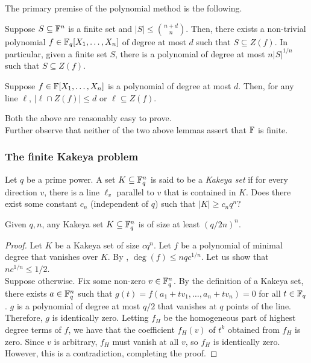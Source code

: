 	The primary premise of the polynomial method is the following.

	\begin{lemma}
		\label{poly method}
		Suppose $S \subseteq \mathbb{F}^n$ is a finite set and $|S| \le \binom{n+d}{n}$. Then, there exists a non-trivial polynomial $f \in \mathbb{F}_q[X_1,\ldots,X_n]$ of degree at most $d$ such that $S \subseteq Z(f)$. In particular, given a finite set $S$, there is a polynomial of degree at most $n|S|^{1/n}$ such that $S \subseteq Z(f)$.
	\end{lemma}

	\begin{lemma}
		\label{poly method: line containment}
		Suppose $f \in \mathbb{F}[X_1,\ldots,X_n]$ is a polynomial of degree at most $d$. Then, for any line $\ell$, $|\ell \cap Z(f)| \le d$ or $\ell \subseteq Z(f)$.
	\end{lemma}

	Both the above are reasonably easy to prove.\\
	Further observe that neither of the two above lemmas assert that $\mathbb{F}$ is finite.

	\subsubsection{The finite Kakeya problem}

		Let $q$ be a prime power. A set $K \subseteq \mathbb{F}_q^n$ is said to be a \emph{Kakeya set} if for every direction $v$, there is a line $\ell_v$ parallel to $v$ that is contained in $K$. Does there exist some constant $c_n$ (independent of $q$) such that $|K| \ge c_n q^n$?

		\begin{prop}
			Given $q,n$, any Kakeya set $K \subseteq \mathbb{F}_q^n$ is of size at least $(q/2n)^n$.
		\end{prop}

		\begin{proof}
			Let $K$ be a Kakeya set of size $cq^n$. Let $f$ be a polynomial of minimal degree that vanishes over $K$. By , $\deg(f) \le nqc^{1/n}$. Let us show that $nc^{1/n} \le 1/2$. \\
			Suppose otherwise.
			Fix some non-zero $v \in \mathbb{F}_q^n$. By the definition of a Kakeya set, there exists $a \in \mathbb{F}_q^n$ such that $g(t) = f(a_1 + tv_1, \ldots, a_n + tv_n) = 0$ for all $t \in \mathbb{F}_q$. $g$ is a polynomial of degree at most $q/2$ that vanishes at $q$ points of the line. Therefore, $g$ is identically zero. Letting $f_H$ be the homogeneous part of highest degree terms of $f$, we have that the coefficient $f_H(v)$ of $t^k$ obtained from $f_H$ is zero. Since $v$ is arbitrary, $f_H$ must vanish at all $v$, so $f_H$ is identically zero. However, this is a contradiction, completing the proof.
		\end{proof}

